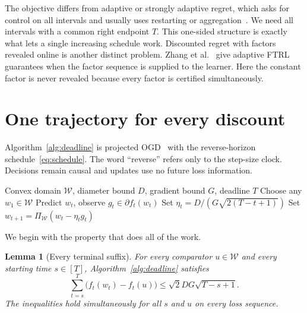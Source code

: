 \documentclass{article}
\newtheorem{lemma}[theorem]{Lemma}
\newcommand{\W}{\mathcal W}
\begin{document}
The objective differs from adaptive or strongly adaptive regret, which asks for control on all intervals and usually uses restarting or aggregation~\citep{daniely2015strongly,cutkosky2020parameter}. We need all intervals with a common right endpoint $T$. This one-sided structure is exactly what lets a single increasing schedule work. Discounted regret with factors revealed online is another distinct problem. Zhang et al.~\citep{zhang2024discounted} give adaptive FTRL guarantees when the factor sequence is supplied to the learner. Here the constant factor is never revealed because every factor is certified simultaneously.

\section{One trajectory for every discount}
\label{sec:upper}

Algorithm~\ref{alg:deadline} is projected OGD~\citep{zinkevich2003online,hazan2016introduction} with the reverse-horizon schedule~\eqref{eq:schedule}. The word ``reverse'' refers only to the step-size clock. Decisions remain causal and updates use no future loss information.

\begin{algorithm}[h]
\caption{Deadline OGD}
\label{alg:deadline}
\begin{algorithmic}[1]
\REQUIRE Convex domain $\W$, diameter bound $D$, gradient bound $G$, deadline $T$
\STATE Choose any $w_1\in\W$
\STATE Predict $w_t$, observe $g_t\in\partial f_t(w_t)$
\STATE Set $\eta_t=D/(G\sqrt{2(T-t+1)})$
\STATE Set $w_{t+1}=\Pi_{\W}(w_t-\eta_tg_t)$
\ENDFOR
\end{algorithmic}
\end{algorithm}

We begin with the property that does all of the work.

\begin{lemma}[Every terminal suffix]
\label{lem:suffix}
For every comparator $u\in\W$ and every starting time $s\in[T]$, Algorithm~\ref{alg:deadline} satisfies \[ \sum_{t=s}^T\bigl(f_t(w_t)-f_t(u)\bigr)\le\sqrt2DG\sqrt{T-s+1}. \] The inequalities hold simultaneously for all $s$ and $u$ on every loss sequence.
\end{lemma}
\end{document}
